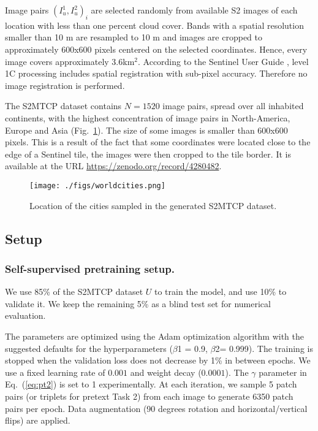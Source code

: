 \documentclass[runningheads]{llncs}
\begin{document}
Image pairs $(I_u^1, I_u^2)_i$ are selected randomly from available S2 images of each location with less than one percent cloud cover. Bands with a spatial resolution smaller than 10 m are resampled to 10 m and images are cropped to approximately 600x600 pixels centered on the selected coordinates. Hence, every image covers approximately 3.6km$^2$. According to the Sentinel User Guide \cite{sentinel:2015:user_handbook}, level 1C processing includes spatial registration with sub-pixel accuracy. Therefore no image registration is performed. 

The S2MTCP dataset contains $N=1520$ image pairs, spread over all inhabited continents, with the highest concentration of image pairs in North-America, Europe and Asia (Fig.~\ref{fig:location_worldcities}). The size of some images is smaller than 600x600 pixels. This is a result of the fact that some coordinates were located close to the edge of a Sentinel tile, the images were then cropped to the tile border. {It is available at the URL \url{https://zenodo.org/record/4280482}}.

\begin{figure}[!t]
    \centering
    \texttt{[image: ./figs/worldcities.png]}
    \caption{Location of the cities sampled in the generated S2MTCP dataset.}
    \label{fig:location_worldcities}
\end{figure}

\subsection{Setup}
\subsubsection{Self-supervised pretraining setup.} \label{sec:setup_pretext_task_performance}
We use 85\% of the S2MTCP dataset $U$ to train the model, and use 10\% to validate it. We keep the remaining 5\% as a blind test set for numerical evaluation.

The parameters are optimized using the Adam optimization algorithm \cite{kingma:2014:adam} with the suggested defaults for the hyperparameters ($\beta$1 = 0.9, $\beta$2= 0.999). The training is stopped when the validation loss does not decrease by  1\% in between epochs. We use a fixed learning rate of $0.001$ and weight decay ($0.0001$). The $\gamma$ parameter in Eq.~(\ref{eq:pt2}) is set to 1 experimentally. At each iteration, we sample 5 patch pairs (or triplets for pretext Task 2) from each image to generate {6350 patch pairs per epoch.} Data augmentation (90 degrees rotation and horizontal/vertical flips) are applied. 
\end{document}
